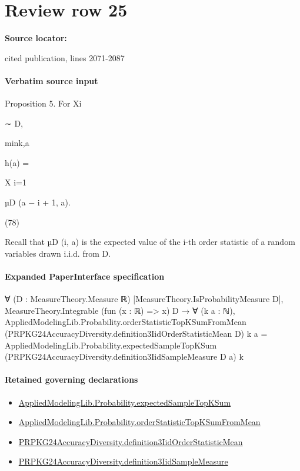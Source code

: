 \documentclass[10pt]{article}
\begin{document}
\section*{Review row 25}
\textbf{Source locator:} {\footnotesize\raggedright cited publication, lines 2071-\allowbreak{}2087\par}
\paragraph{Verbatim source input}
\begin{ReviewVerbatim}
Proposition 5. For Xi

∼ D,

min{k,a}

h(a) =

X
i=1

µD (a − i + 1, a).

(78)

Recall that µD (i, a) is the expected value of the i-th order statistic of a random variables drawn i.i.d.
from D.
\end{ReviewVerbatim}



\paragraph{Expanded PaperInterface specification}
\begin{ReviewVerbatim}
∀ (D : MeasureTheory.Measure ℝ) [MeasureTheory.IsProbabilityMeasure D],
  MeasureTheory.Integrable (fun (x : ℝ) => x) D →
    ∀ (k a : ℕ),
      AppliedModelingLib.Probability.orderStatisticTopKSumFromMean
          (PRPKG24AccuracyDiversity.definition3IidOrderStatisticMean D) k a =
        AppliedModelingLib.Probability.expectedSampleTopKSum (PRPKG24AccuracyDiversity.definition3IidSampleMeasure D a)
          k
\end{ReviewVerbatim}

\paragraph{Retained governing declarations}
\begin{itemize}\raggedright
\item \hyperlink{governing-declaration-ce2e2b3f3ae2c88d}{Applied\allowbreak{}Modeling\allowbreak{}Lib.\allowbreak{}Probability.\allowbreak{}expected\allowbreak{}Sample\allowbreak{}Top\allowbreak{}K\allowbreak{}Sum}
\item \hyperlink{governing-declaration-136af6c24817324b}{Applied\allowbreak{}Modeling\allowbreak{}Lib.\allowbreak{}Probability.\allowbreak{}order\allowbreak{}Statistic\allowbreak{}Top\allowbreak{}K\allowbreak{}Sum\allowbreak{}From\allowbreak{}Mean}
\item \hyperlink{paper-prerequisite-62a80495e02812f6}{PRPKG24\allowbreak{}Accuracy\allowbreak{}Diversity.\allowbreak{}definition3\allowbreak{}Iid\allowbreak{}Order\allowbreak{}Statistic\allowbreak{}Mean}
\item \hyperlink{governing-declaration-267695cdd16a46ea}{PRPKG24\allowbreak{}Accuracy\allowbreak{}Diversity.\allowbreak{}definition3\allowbreak{}Iid\allowbreak{}Sample\allowbreak{}Measure}
\end{itemize}
\end{document}
